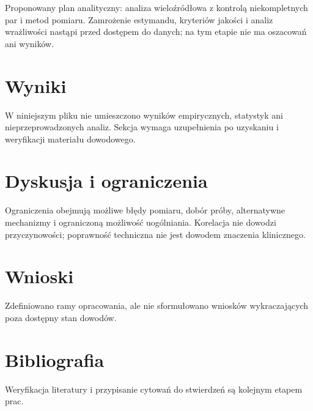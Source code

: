 \documentclass[11pt,a4paper]{article}
\begin{document}
Proponowany plan analityczny: analiza wieloźródłowa z kontrolą niekompletnych par i metod pomiaru. Zamrożenie estymandu, kryteriów jakości i analiz wrażliwości nastąpi przed dostępem do danych; na tym etapie nie ma oszacowań ani wyników.

\section{Wyniki}

W niniejszym pliku nie umieszczono wyników empirycznych, statystyk ani nieprzeprowadzonych analiz. Sekcja wymaga uzupełnienia po uzyskaniu i weryfikacji materiału dowodowego.

\section{Dyskusja i ograniczenia}

Ograniczenia obejmują możliwe błędy pomiaru, dobór próby, alternatywne mechanizmy i ograniczoną możliwość uogólniania. Korelacja nie dowodzi przyczynowości; poprawność techniczna nie jest dowodem znaczenia klinicznego.

\section{Wnioski}

Zdefiniowano ramy opracowania, ale nie sformułowano wniosków wykraczających poza dostępny stan dowodów.

\section*{Bibliografia}

Weryfikacja literatury i przypisanie cytowań do stwierdzeń są kolejnym etapem prac.
\end{document}
